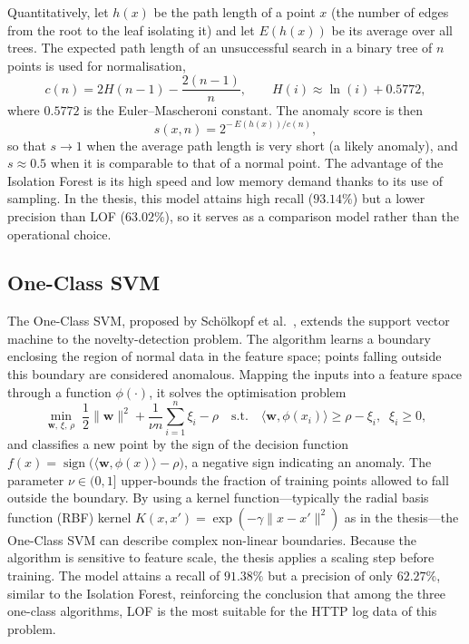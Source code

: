 Quantitatively, let $h(x)$ be the path length of a point $x$ (the number of
edges from the root to the leaf isolating it) and let $E(h(x))$ be its
average over all trees. The expected path length of an unsuccessful search in
a binary tree of $n$ points is used for normalisation,
\begin{equation}
  c(n) = 2H(n-1) - \frac{2(n-1)}{n},
  \qquad H(i) \approx \ln(i) + 0.5772,
  \label{eq:cn}
\end{equation}
where $0.5772$ is the Euler--Mascheroni constant. The anomaly score is then
\begin{equation}
  s(x,n) = 2^{-\,E(h(x))/c(n)} ,
  \label{eq:ifscore}
\end{equation}
so that $s \to 1$ when the average path length is very short (a likely
anomaly), and $s \approx 0.5$ when it is comparable to that of a normal
point. The advantage of the
Isolation Forest is its high speed and low memory demand thanks to its use
of sampling. In the thesis, this model attains high recall ($93.14\%$) but
a lower precision than LOF ($63.02\%$), so it serves as a comparison model
rather than the operational choice.

\subsection{One-Class SVM}

The One-Class SVM, proposed by Sch\"{o}lkopf et al.~\cite{scholkopf1999},
extends the support vector machine to the novelty-detection problem. The
algorithm learns a boundary enclosing the region of normal data in the
feature space; points falling outside this boundary are considered
anomalous. Mapping the inputs into a feature space through a function
$\phi(\cdot)$, it solves the optimisation problem
\begin{equation}
  \min_{\mathbf{w},\,\xi,\,\rho}\;
  \frac{1}{2}\lVert \mathbf{w}\rVert^{2}
  + \frac{1}{\nu n}\sum_{i=1}^{n}\xi_i - \rho
  \quad\text{s.t.}\quad
  \langle \mathbf{w}, \phi(x_i)\rangle \geq \rho - \xi_i,\;\; \xi_i \geq 0,
  \label{eq:ocsvm}
\end{equation}
and classifies a new point by the sign of the decision function
$f(x) = \operatorname{sign}\!\big(\langle \mathbf{w}, \phi(x)\rangle - \rho\big)$,
a negative sign indicating an anomaly. The parameter $\nu \in (0,1]$ upper-bounds
the fraction of training points allowed to fall outside the boundary. By
using a kernel function---typically the radial basis function (RBF) kernel
$K(x,x') = \exp(-\gamma\lVert x - x'\rVert^{2})$ as in the thesis---the
One-Class SVM can describe complex non-linear boundaries. Because the
algorithm is sensitive to feature scale, the thesis applies a scaling step
before training. The model attains a
recall of $91.38\%$ but a precision of only $62.27\%$, similar to the
Isolation Forest, reinforcing the conclusion that among the three one-class
algorithms, LOF is the most suitable for the HTTP log data of this problem.

